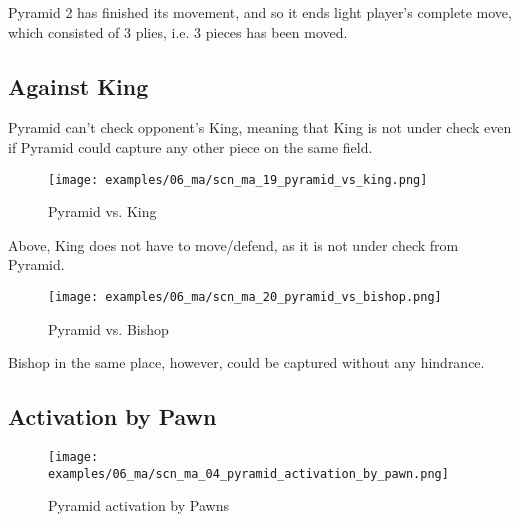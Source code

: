 Pyramid 2 has finished its movement, and so it ends light player's complete move,
which consisted of 3 plies, i.e. 3 pieces has been moved.

\clearpage %

\subsection*{Against King}
\label{sec:Mayan Ascendancy/Pyramid/Against King}

Pyramid can't check opponent's King, meaning that King is not under check even if
Pyramid could capture any other piece on the same field.

\noindent
\begin{figure}[!h]
\texttt{[image: examples/06\_ma/scn\_ma\_19\_pyramid\_vs\_king.png]}
\caption{Pyramid vs. King}
\label{fig:scn_ma_19_pyramid_vs_king}
\end{figure}

Above, King does not have to move/defend, as it is not under check from Pyramid.

\noindent
\begin{figure}[!h]
\texttt{[image: examples/06\_ma/scn\_ma\_20\_pyramid\_vs\_bishop.png]}
\caption{Pyramid vs. Bishop}
\label{fig:scn_ma_20_pyramid_vs_bishop}
\end{figure}

Bishop in the same place, however, could be captured without any hindrance.

\clearpage %

\subsection*{Activation by Pawn}
\label{sec:Mayan Ascendancy/Pyramid/Activation by Pawn}

\noindent
\begin{figure}[!h]
\texttt{[image: examples/06\_ma/scn\_ma\_04\_pyramid\_activation\_by\_pawn.png]}
\caption{Pyramid activation by Pawns}
\label{fig:scn_ma_04_pyramid_activation_by_pawn}
\end{figure}

